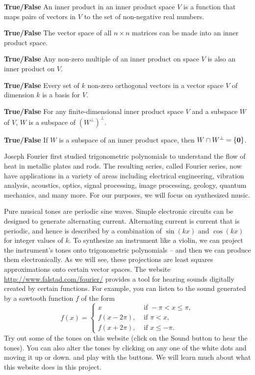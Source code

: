 	\item \textbf{True/False} An inner product in an inner product space $V$ is a function that maps pairs of vectors in $V$ to the set of non-negative real numbers. 
	\item \textbf{True/False} The vector space of all $n \times n$ matrices can be made into an inner product space.  
	\item \textbf{True/False} Any non-zero multiple of an inner product on space $V$ is also an inner product on $V$.
  \item \textbf{True/False} Every set of $k$ non-zero orthogonal vectors in a vector space $V$ of dimension $k$ is a basis for $V$. 
	\item \textbf{True/False} For any finite-dimensional inner product space $V$ and a subspace $W$ of $V$, $W$ is a subspace of $(W^\perp)^\perp$.
	\item \textbf{True/False} If $W$ is a subspace of an inner product space, then $W\cap W^\perp = \{\mathbf{0}\}$.
	\ea    
	  

\ee

\label{sec:proj_fourier}

Joseph Fourier first studied trigonometric polynomials to understand the flow of heat in metallic plates and rods. The resulting series, called Fourier series, now have applications in a variety of areas including  electrical engineering, vibration  analysis, acoustics, optics, signal processing, image processing, geology, quantum mechanics, and many more. For our purposes, we will focus on synthesized music.

Pure musical tones are periodic sine waves. Simple electronic circuits can be designed to generate alternating current. Alternating current is current that is periodic, and hence is described by a combination of $\sin(kx)$ and $\cos(kx)$ for integer values of $k$. To synthesize an instrument like a violin, we can project the instrument's tones onto trigonometric polynomials -- and then we can produce them electronically. As we will see, these projections are least squares approximations onto certain vector spaces.
The website \url{http://www.falstad.com/fourier/} provides a tool for hearing sounds digitally created by certain functions. For example, you can listen to the sound generated by a sawtooth function $f$ of the form
\[f(x) = \begin{cases}
x &\text{ if } -\pi < x \leq \pi, \\
f(x-2\pi), 	& \text{ if } \pi < x, \\	
f(x+2\pi), 	& \text{ if } x \leq -\pi.
\end{cases}\]
Try out some of the tones on this website (click on the Sound button to hear the tones). You can also alter the tones by clicking on any one of the white dots and moving it up or down.  and play with the buttons.  We will learn much about what this website does in this project.

